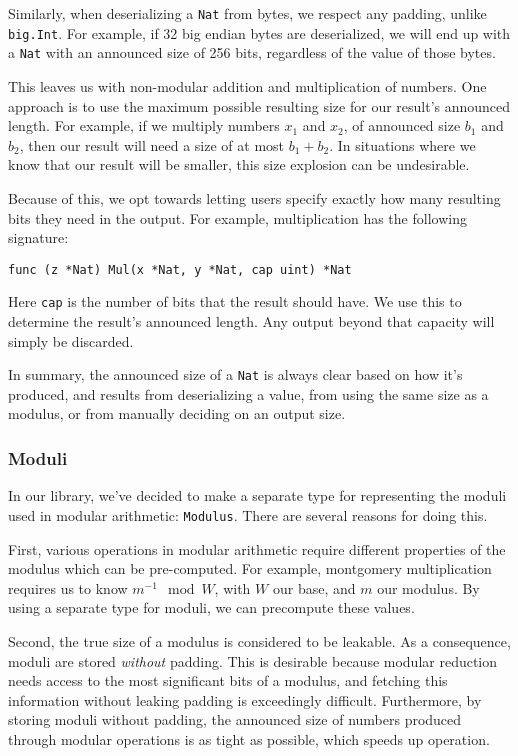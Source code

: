 \documentclass[11pt, a4paper]{article} %
\begin{document}
{Similarly, when deserializing a \texttt{Nat} from bytes,
we respect any padding, unlike \texttt{big.Int}. For example,
if 32 big endian bytes are deserialized, we will end up
with a \texttt{Nat} with an announced size of 256 bits, regardless
of the value of those bytes.

This leaves us with non-modular addition and multiplication of numbers.
One approach is to use the maximum possible resulting size for our
result's announced length. For example, if we multiply
numbers $x_1$ and $x_2$, of announced size $b_1$ and $b_2$, then
our result will need a size of at most $b_1 + b_2$.
In situations where we know that our result will be smaller,
this size explosion can be undesirable.

Because of this, we opt towards letting users specify exactly how many
resulting bits they need in the output. For example,
multiplication has the following signature:

\begin{verbatim}
func (z *Nat) Mul(x *Nat, y *Nat, cap uint) *Nat
\end{verbatim}

Here \texttt{cap} is the number of bits that the result should have.
We use this to determine the result's announced length. Any output
beyond that capacity will simply be discarded.

In summary, the announced size of a \texttt{Nat} is always
clear based on how it's produced, and results from deserializing
a value, from using the same size as a modulus, or from manually
deciding on an output size.

\subsubsection{Moduli}

In our library, we've decided to make a separate type for representing
the moduli used in modular arithmetic: \texttt{Modulus}. There are several
reasons for doing this.

First, various operations in modular arithmetic require different properties
of the modulus which can be pre-computed. For example, montgomery multiplication
requires us to know $m^{-1} \mod W$, with $W$ our base,
and $m$ our modulus. By using a separate type for moduli, we can
precompute these values.

Second, the true size of a modulus is considered to be leakable.
As a consequence, moduli are stored \emph{without} padding.
This is desirable because modular reduction needs access to the most
significant bits of a modulus, and fetching this information without
leaking padding is exceedingly difficult. Furthermore,
by storing moduli without padding, the announced size of numbers produced
through modular operations is as tight as possible, which speeds
up operation.

}
\end{document}
